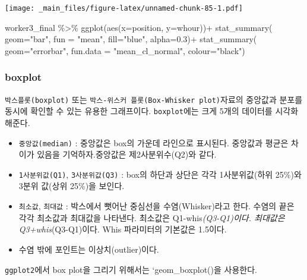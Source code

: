 \documentclass[
]{book}
\newenvironment{Shaded}{\begin{snugshade}}{\end{snugshade}}
\newcommand{\AttributeTok}[1]{\textcolor[rgb]{0.77,0.63,0.00}{#1}}
\newcommand{\FloatTok}[1]{\textcolor[rgb]{0.00,0.00,0.81}{#1}}
\newcommand{\FunctionTok}[1]{\textcolor[rgb]{0.00,0.00,0.00}{#1}}
\newcommand{\NormalTok}[1]{#1}
\newcommand{\SpecialCharTok}[1]{\textcolor[rgb]{0.00,0.00,0.00}{#1}}
\newcommand{\StringTok}[1]{\textcolor[rgb]{0.31,0.60,0.02}{#1}}
\providecommand{\tightlist}{%
  \setlength{\itemsep}{0pt}\setlength{\parskip}{0pt}}
\theoremstyle{definition}
\theoremstyle{definition}
\theoremstyle{definition}
\theoremstyle{definition}
\theoremstyle{remark}
\begin{document}
\texttt{[image: \_main\_files/figure-latex/unnamed-chunk-85-1.pdf]}

\begin{Shaded}
\begin{Highlighting}[]
\NormalTok{worker3\_final }\SpecialCharTok{\%\textgreater{}\%} 
  \FunctionTok{ggplot}\NormalTok{(}\FunctionTok{aes}\NormalTok{(}\AttributeTok{x=}\NormalTok{position, }\AttributeTok{y=}\NormalTok{whour))}\SpecialCharTok{+}
  \FunctionTok{stat\_summary}\NormalTok{(}
    \AttributeTok{geom=}\StringTok{"bar"}\NormalTok{, }
    \AttributeTok{fun =} \StringTok{"mean"}\NormalTok{, }
    \AttributeTok{fill=}\StringTok{"blue"}\NormalTok{, }
    \AttributeTok{alpha=}\FloatTok{0.3}\NormalTok{)}\SpecialCharTok{+}
  \FunctionTok{stat\_summary}\NormalTok{(}
    \AttributeTok{geom=}\StringTok{"errorbar"}\NormalTok{, }
    \AttributeTok{fun.data =} \StringTok{"mean\_cl\_normal"}\NormalTok{, }
    \AttributeTok{colour=}\StringTok{"black"}\NormalTok{)}
\end{Highlighting}
\end{Shaded}

\hypertarget{boxplot}{%
\subsubsection{boxplot}\label{boxplot}}

\texttt{박스플롯(boxplot)} 또는 \texttt{박스-위스커\ 플롯(Box-Whisker\ plot)}자료의 중앙값과 분포를 동시에 확인할 수 있는 유용한 그래프이다. \texttt{boxplot}에는 크게 5개의 데이터를 시각화해준다.

\begin{itemize}
\tightlist
\item
  \texttt{중앙값(median)} : 중앙값은 box의 가운데 라인으로 표시된다. 중앙값과 평균은 차이가 있음을 기억하자.중앙값은 제2사분위수(Q2)와 같다.\\
\item
  \texttt{1사분위값(Q1)}, \texttt{3사분위값(Q3)} : box의 하단과 상단은 각각 1사분위값(하위 25\%)와 3분위 값(상위 25\%)을 보인다.
\item
  \texttt{최소값}, \texttt{최대값} : 박스에서 뻣어난 중심선을 수염(Whisker)라고 한다. 수염의 끝은 각각 최소값과 최대값을 나타낸다. 최소값은 Q1-whis\emph{(Q3-Q1)이다.
  최대값은 Q3+whis}(Q3-Q1)이다. Whis 파라미터의 기본값은 1.5이다.
\item
  수염 밖에 포인트는 이상치(outlier)이다.
\end{itemize}

\texttt{ggplot2}에서 box plot을 그리기 위해서는 `geom\_boxplot()을 사용한다.
\end{document}
